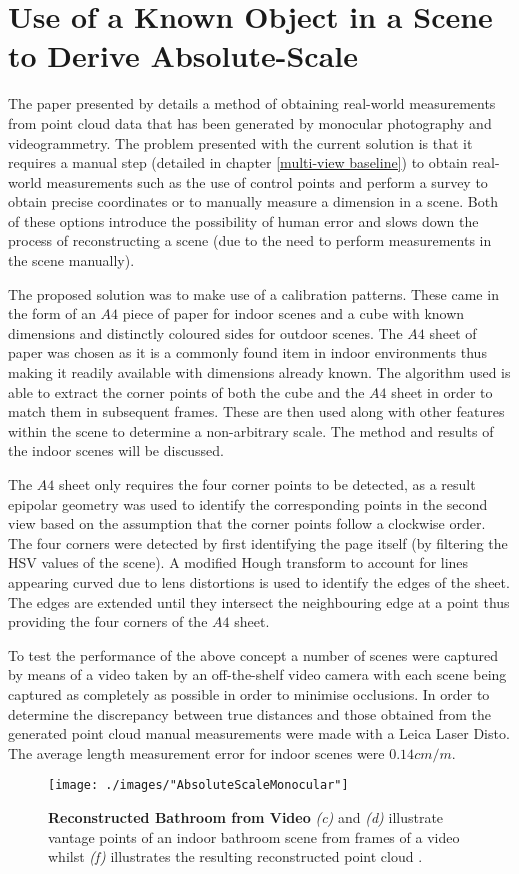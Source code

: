 \section{Use of a Known Object in a Scene to Derive Absolute-Scale}
The paper presented by \citet{rashidi_generating_2014} details a method of obtaining real-world measurements from point cloud data that has been generated by monocular photography and videogrammetry. The problem presented with the current solution is that it requires a manual step (detailed in chapter \ref{multi-view baseline}) to obtain real-world measurements such as the use of control points and perform a survey to obtain precise coordinates or to manually measure a dimension in a scene. Both of these options introduce the possibility of human error and slows down the process of reconstructing a scene (due to the need to perform measurements in the scene manually). 

The proposed solution was to make use of a calibration patterns. These came in the form of an $A4$ piece of paper for indoor scenes and a cube with known dimensions and distinctly coloured sides for outdoor scenes. The $A4$ sheet of paper was chosen as it is a commonly found item in indoor environments thus making it readily available with dimensions already known. The algorithm used is able to extract the corner points of both the cube and the $A4$ sheet in order to match them in subsequent frames. These are then used along with other features within the scene to determine a non-arbitrary scale. The method and results of the indoor scenes will be discussed. 

The $A4$ sheet only requires the four corner points to be detected, as a result epipolar geometry was used to identify the corresponding points in the second view based on the assumption that the corner points follow a clockwise order. The four corners were detected by first identifying the page itself (by filtering the HSV values of the scene). A modified Hough transform to account for lines appearing curved due to lens distortions is used to identify the edges of the sheet. The edges are extended until they intersect the neighbouring edge at a point thus providing the four corners of the $A4$ sheet.

To test the performance of the above concept a number of scenes were captured by means of a video taken by an off-the-shelf video camera with each scene being captured as completely as possible in order to minimise occlusions. In order to determine the discrepancy between true distances and those obtained from the generated point cloud manual measurements were made with a Leica Laser Disto. The average length measurement error for indoor scenes were $0.14cm/m$.
\clearpage
\begin{figure}[ht!]
	\centering
	\texttt{[image: ./images/"AbsoluteScaleMonocular"]}
	\caption{\textbf{Reconstructed Bathroom from Video} \textit{(c)} and \textit{(d)} illustrate vantage points of an indoor bathroom scene from frames of a video whilst \textit{(f)} illustrates the resulting reconstructed point cloud \citep{rashidi_generating_2014}.
		\label{monocular}}
\end{figure}

